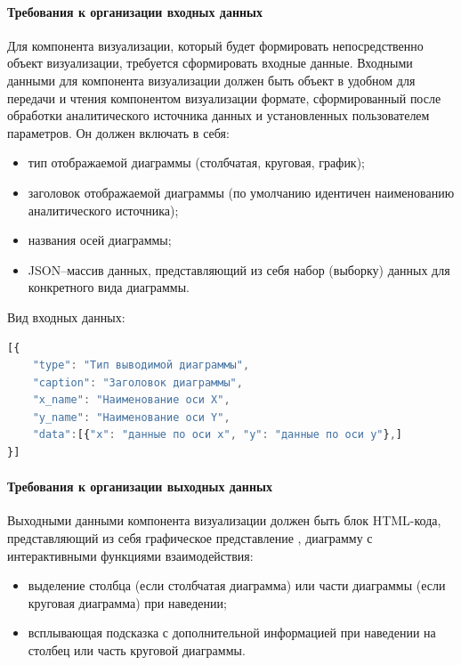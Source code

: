 \documentclass[a4paper]{extarticle}
\begin{document}
\paragraph{Требования к организации входных данных}
Для компонента визуализации, который будет формировать непосредственно объект визуализации, требуется сформировать входные данные. Входными данными для компонента визуализации должен быть объект в удобном для передачи и чтения компонентом визуализации формате, сформированный после обработки аналитического источника данных и установленных пользователем параметров. Он должен включать в себя:\par
\begin{itemize}
  \item тип отображаемой диаграммы (столбчатая, круговая, график);
  \item заголовок отображаемой диаграммы (по умолчанию идентичен наименованию аналитического источника);
  \item названия осей диаграммы;
  \item JSON–массив данных, представляющий из себя набор (выборку) данных для конкретного вида диаграммы.
\end{itemize}\par
Вид входных данных:\par
\lstset{inputencoding=utf8, extendedchars=\true, commentstyle=\itshape}
\begin{lstlisting}[language=JavaScript]
[{
	"type": "Тип выводимой диаграммы",
	"caption": "Заголовок диаграммы",
	"x_name": "Наименование оси X",
	"y_name": "Наименование оси Y",
	"data":[{"x": "данные по оси x", "y": "данные по оси y"},]
}]
\end{lstlisting}

\paragraph{Требования к организации выходных данных}
Выходными данными компонента визуализации должен быть блок HTML-кода, представляющий из себя графическое представление , диаграмму с интерактивными функциями взаимодействия:
\begin{itemize}
  \item выделение столбца (если столбчатая диаграмма) или части диаграммы (если круговая диаграмма) при наведении;
  \item всплывающая подсказка с дополнительной информацией при наведении на столбец или часть круговой диаграммы.
\end{itemize}
\end{document}

